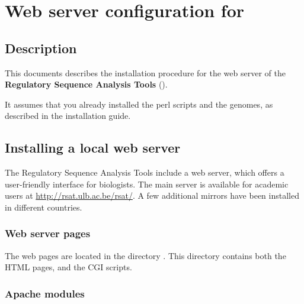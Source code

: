 \documentclass[12pt,a4paper, twoside]{scrreprt} %
\begin{document}


\newpage
\tableofcontents
\newpage

\chapter{Web server configuration for \RSAT}

\section{Description}

This documents describes the installation procedure for the web server
of the \textbf{Regulatory Sequence Analysis Tools} (\RSAT).

It assumes that you already installed the perl scripts and the
genomes, as described in the \RSAT installation guide.


\section{Installing a local web server}

The Regulatory Sequence Analysis Tools include a web server, which
offers a user-friendly interface for biologists. The main server is
available for academic users at \url{http://rsat.ulb.ac.be/rsat/}. A
few additional mirrors have been installed in different countries.

\subsection{Web server pages}

The web pages are located in the directory
. This directory contains both the HTML
pages, and the CGI scripts.

\subsection{Apache modules}
\end{document}
